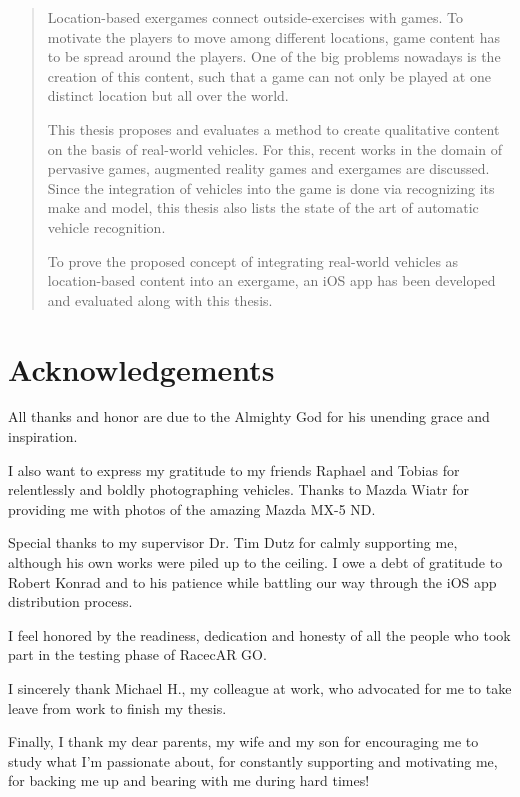 \begin{abstract}
Location-based exergames connect outside-exercises with games. To motivate the players to move among different locations, game content has to be spread around the players. One of the big problems nowadays is the creation of this content, such that a game can not only be played at one distinct location but all over the world.
 
This thesis proposes and evaluates a method to create qualitative content on the basis of real-world vehicles. For this, recent works in the domain of pervasive games, augmented reality games and exergames are discussed. Since the integration of vehicles into the game is done via recognizing its make and model, this thesis also lists the state of the art of automatic vehicle recognition.
 
To prove the proposed concept of integrating real-world vehicles as location-based content into an exergame, an iOS app has been developed and evaluated along with this thesis.
\end{abstract}

\clearpage

\section*{Acknowledgements}
All thanks and honor are due to the Almighty God for his unending grace and inspiration.

I also want to express my gratitude to my friends Raphael and Tobias for relentlessly and boldly photographing vehicles. Thanks to Mazda Wiatr for providing me with photos of the amazing Mazda MX-5 ND.

Special thanks to my supervisor Dr. Tim Dutz for calmly supporting me, although his own works were piled up to the ceiling. I owe a debt of gratitude to Robert Konrad and to his patience while battling our way through the iOS app distribution process.

I feel honored by the readiness, dedication and honesty of all the people who took part in the testing phase of RacecAR GO.

I sincerely thank Michael H., my colleague at work, who advocated for me to take leave from work to finish my thesis.

Finally, I thank my dear parents, my wife and my son for encouraging me to study what I'm passionate about, for constantly supporting and motivating me, for backing me up and bearing with me during hard times!




